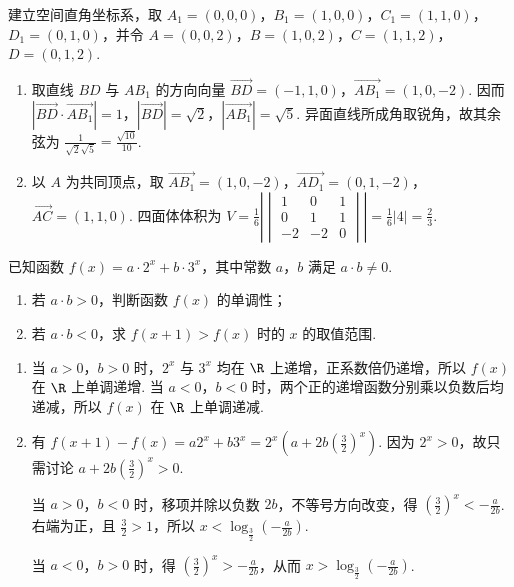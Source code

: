 \begin{solution}
建立空间直角坐标系，取
\(A_1=(0,0,0)\)，\(B_1=(1,0,0)\)，\(C_1=(1,1,0)\)，\(D_1=(0,1,0)\)，并令
\(A=(0,0,2)\)，\(B=(1,0,2)\)，\(C=(1,1,2)\)，\(D=(0,1,2)\).

\begin{enumerate}
\item 取直线 \(BD\) 与 \(AB_1\) 的方向向量 \(\overrightarrow{BD}=(-1,1,0)\)，\(\overrightarrow{AB_1}=(1,0,-2)\). 因而
\(\left|\overrightarrow{BD}\cdot\overrightarrow{AB_1}\right|=1\)，\(\left|\overrightarrow{BD}\right|=\sqrt2\)，\(\left|\overrightarrow{AB_1}\right|=\sqrt5\). 异面直线所成角取锐角，故其余弦为
\(\frac{1}{\sqrt2\sqrt5}=\frac{\sqrt{10}}{10}\).

\item 以 \(A\) 为共同顶点，取
\(\overrightarrow{AB_1}=(1,0,-2)\)，\(\overrightarrow{AD_1}=(0,1,-2)\)，\(\overrightarrow{AC}=(1,1,0)\). 四面体体积为
\(V=\frac16\left|\begin{vmatrix}1&0&1\\0&1&1\\-2&-2&0\end{vmatrix}\right|=\frac16\left|4\right|=\frac23\).
\end{enumerate}
\end{solution}

\begin{problem}
已知函数 \(f(x) = a \cdot 2^{x} + b \cdot 3^{x}\)，其中常数 \(a\)，\(b\) 满足 \(a \cdot b \neq 0\).
\begin{enumerate}
\item 若 \(a \cdot b > 0\)，判断函数 \(f(x)\) 的单调性；
\item 若 \(a \cdot b < 0\)，求 \(f(x + 1) > f(x)\) 时的 \(x\) 的取值范围.
\end{enumerate}
\end{problem}

\begin{solution}
\begin{enumerate}
\item 当 \(a>0\)，\(b>0\) 时，\(2^x\) 与 \(3^x\) 均在 \(\R\) 上递增，正系数倍仍递增，所以 \(f(x)\) 在 \(\R\) 上单调递增. 当 \(a<0\)，\(b<0\) 时，两个正的递增函数分别乘以负数后均递减，所以 \(f(x)\) 在 \(\R\) 上单调递减.

\item 有
\(f(x+1)-f(x)=a2^x+b3^x=2^x\left(a+2b\left(\frac32\right)^x\right)\). 因为 \(2^x>0\)，故只需讨论 \(a+2b\left(\frac32\right)^x>0\).

当 \(a>0\)，\(b<0\) 时，移项并除以负数 \(2b\)，不等号方向改变，得
\(\left(\frac32\right)^x<-\frac{a}{2b}\). 右端为正，且 \(\frac32>1\)，所以 \(x<\log_{\frac32}\left(-\frac{a}{2b}\right)\).

当 \(a<0\)，\(b>0\) 时，得
\(\left(\frac32\right)^x>-\frac{a}{2b}\)，从而 \(x>\log_{\frac32}\left(-\frac{a}{2b}\right)\).
\end{enumerate}
\end{solution}


